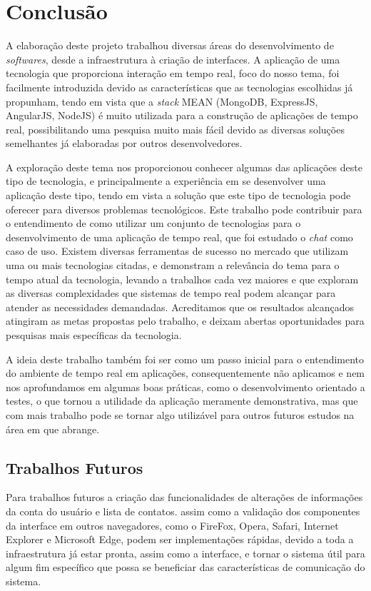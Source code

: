 \chapter{Conclusão}
A elaboração deste projeto trabalhou diversas áreas do desenvolvimento de \textit{softwares}, desde a infraestrutura à criação de interfaces. A aplicação de uma tecnologia que proporciona interação em tempo real, foco do nosso tema, foi facilmente introduzida devido as características que as tecnologias escolhidas já propunham, tendo em vista que a \textit{stack} MEAN (MongoDB, ExpressJS, AngularJS, NodeJS) é muito utilizada para a construção de aplicações de tempo real, possibilitando uma pesquisa muito mais fácil devido as diversas soluções semelhantes já elaboradas por outros desenvolvedores.

A exploração deste tema nos proporcionou conhecer algumas das aplicações deste tipo de tecnologia, e principalmente a experiência em se desenvolver uma aplicação deste tipo, tendo em vista a solução que este tipo de tecnologia pode oferecer para diversos problemas tecnológicos. Este trabalho pode contribuir para o entendimento de como utilizar um conjunto de tecnologias para o desenvolvimento de uma aplicação de tempo real, que foi estudado o \textit{chat} como caso de uso. Existem diversas ferramentas de sucesso no mercado que utilizam uma ou mais tecnologias citadas, e demonstram a relevância do tema para o tempo atual da tecnologia, levando a trabalhos cada vez maiores e que exploram as diversas complexidades que sistemas de tempo real podem alcançar para atender as necessidades demandadas. Acreditamos que os resultados alcançados atingiram as metas propostas pelo trabalho, e deixam abertas oportunidades para pesquisas mais específicas da tecnologia.

A ideia deste trabalho também foi ser como um passo inicial para o entendimento do ambiente de tempo real em aplicações, consequentemente não aplicamos e nem nos aprofundamos em algumas boas práticas, como o desenvolvimento orientado a testes, o que tornou a utilidade da aplicação meramente demonstrativa, mas que com mais trabalho pode se tornar algo utilizável para outros futuros estudos na área em que abrange.

\section{Trabalhos Futuros}
Para trabalhos futuros a criação das funcionalidades de alterações de informações da conta do usuário e lista de contatos. assim como a validação dos componentes da interface em outros navegadores, como o FireFox, Opera, Safari, Internet Explorer e Microsoft Edge, podem ser implementações rápidas, devido a toda a infraestrutura já estar pronta, assim como a interface, e tornar o sistema útil para algum fim específico que possa se beneficiar das características de comunicação do sistema.


